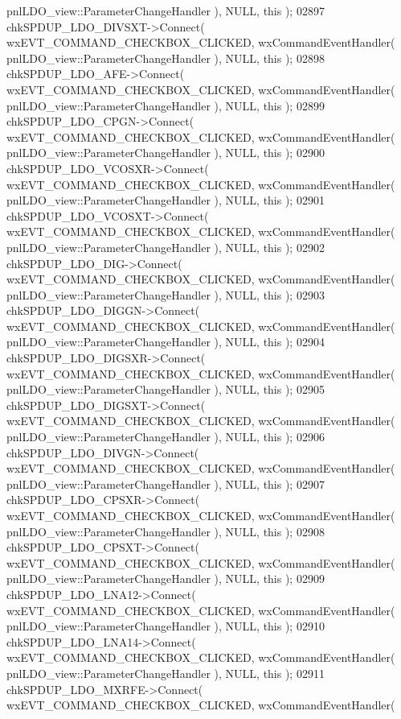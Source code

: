 \begin{DoxyCode}
      pnlLDO_view::ParameterChangeHandler ), NULL, \textcolor{keyword}{this} );
02897     chkSPDUP_LDO_DIVSXT->Connect( wxEVT\_COMMAND\_CHECKBOX\_CLICKED, wxCommandEventHandler( 
      pnlLDO_view::ParameterChangeHandler ), NULL, \textcolor{keyword}{this} );
02898     chkSPDUP_LDO_AFE->Connect( wxEVT\_COMMAND\_CHECKBOX\_CLICKED, wxCommandEventHandler( 
      pnlLDO_view::ParameterChangeHandler ), NULL, \textcolor{keyword}{this} );
02899     chkSPDUP_LDO_CPGN->Connect( wxEVT\_COMMAND\_CHECKBOX\_CLICKED, wxCommandEventHandler( 
      pnlLDO_view::ParameterChangeHandler ), NULL, \textcolor{keyword}{this} );
02900     chkSPDUP_LDO_VCOSXR->Connect( wxEVT\_COMMAND\_CHECKBOX\_CLICKED, wxCommandEventHandler( 
      pnlLDO_view::ParameterChangeHandler ), NULL, \textcolor{keyword}{this} );
02901     chkSPDUP_LDO_VCOSXT->Connect( wxEVT\_COMMAND\_CHECKBOX\_CLICKED, wxCommandEventHandler( 
      pnlLDO_view::ParameterChangeHandler ), NULL, \textcolor{keyword}{this} );
02902     chkSPDUP_LDO_DIG->Connect( wxEVT\_COMMAND\_CHECKBOX\_CLICKED, wxCommandEventHandler( 
      pnlLDO_view::ParameterChangeHandler ), NULL, \textcolor{keyword}{this} );
02903     chkSPDUP_LDO_DIGGN->Connect( wxEVT\_COMMAND\_CHECKBOX\_CLICKED, wxCommandEventHandler( 
      pnlLDO_view::ParameterChangeHandler ), NULL, \textcolor{keyword}{this} );
02904     chkSPDUP_LDO_DIGSXR->Connect( wxEVT\_COMMAND\_CHECKBOX\_CLICKED, wxCommandEventHandler( 
      pnlLDO_view::ParameterChangeHandler ), NULL, \textcolor{keyword}{this} );
02905     chkSPDUP_LDO_DIGSXT->Connect( wxEVT\_COMMAND\_CHECKBOX\_CLICKED, wxCommandEventHandler( 
      pnlLDO_view::ParameterChangeHandler ), NULL, \textcolor{keyword}{this} );
02906     chkSPDUP_LDO_DIVGN->Connect( wxEVT\_COMMAND\_CHECKBOX\_CLICKED, wxCommandEventHandler( 
      pnlLDO_view::ParameterChangeHandler ), NULL, \textcolor{keyword}{this} );
02907     chkSPDUP_LDO_CPSXR->Connect( wxEVT\_COMMAND\_CHECKBOX\_CLICKED, wxCommandEventHandler( 
      pnlLDO_view::ParameterChangeHandler ), NULL, \textcolor{keyword}{this} );
02908     chkSPDUP_LDO_CPSXT->Connect( wxEVT\_COMMAND\_CHECKBOX\_CLICKED, wxCommandEventHandler( 
      pnlLDO_view::ParameterChangeHandler ), NULL, \textcolor{keyword}{this} );
02909     chkSPDUP_LDO_LNA12->Connect( wxEVT\_COMMAND\_CHECKBOX\_CLICKED, wxCommandEventHandler( 
      pnlLDO_view::ParameterChangeHandler ), NULL, \textcolor{keyword}{this} );
02910     chkSPDUP_LDO_LNA14->Connect( wxEVT\_COMMAND\_CHECKBOX\_CLICKED, wxCommandEventHandler( 
      pnlLDO_view::ParameterChangeHandler ), NULL, \textcolor{keyword}{this} );
02911     chkSPDUP_LDO_MXRFE->Connect( wxEVT\_COMMAND\_CHECKBOX\_CLICKED, wxCommandEventHandler( 

\end{DoxyCode}
